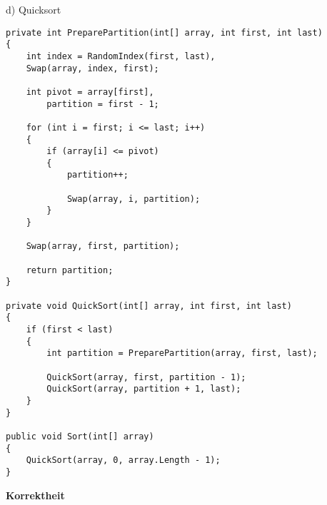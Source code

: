 d) Quicksort
\begin{verbatim}
private int PreparePartition(int[] array, int first, int last)
{
    int index = RandomIndex(first, last),
    Swap(array, index, first);

    int pivot = array[first],
        partition = first - 1;

    for (int i = first; i <= last; i++)
    {
        if (array[i] <= pivot)
        {
            partition++;

            Swap(array, i, partition);
        }
    }

    Swap(array, first, partition);

    return partition;
}

private void QuickSort(int[] array, int first, int last)
{
    if (first < last)
    {
        int partition = PreparePartition(array, first, last);

        QuickSort(array, first, partition - 1);
        QuickSort(array, partition + 1, last);
    }
}

public void Sort(int[] array)
{
    QuickSort(array, 0, array.Length - 1);
}
\end{verbatim}
\vspace{-0.3cm}
\textbf{Korrektheit} \\

